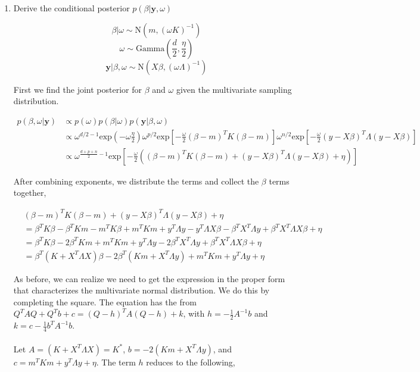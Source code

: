\documentclass[10pt]{article}
\newcommand{\by}{\mathbf{y}}
\begin{document}
    \begin{enumerate}[label=(\Alph*)]

      \item Derive the conditional posterior $p(\beta| \by, \omega)$

        $$\beta | \omega \sim \text{N}(m, (\omega K)^{-1})$$
        $$\omega \sim \text{Gamma}\left(\frac{d}{2}, \frac{\eta}{2} \right)$$
        $$\by | \beta, \omega \sim \text{N}(X\beta, (\omega \Lambda)^{-1})$$

        First we find the joint posterior for $\beta$ and $\omega$ given the multivariate sampling distribution. 

        \begin{align*}
          p(\beta, \omega | \by) &\propto p(\omega) p(\beta| \omega) p(\by | \beta, \omega) \\
          &\propto \omega^{d/2 -1} \text{exp}\left( - \omega \frac{\eta}{2}\right) \omega^{p/2} \text{exp}\left[ -\frac{\omega}{2} (\beta - m)^T K (\beta - m) \right] \omega^{n/2} \text{exp}\left[ -\frac{\omega}{2} (y - X\beta)^T \Lambda (y - X\beta) \right] \\
          &\propto \omega^{\frac{d+p+n}{2}-1} \text{exp}\left[-\frac{\omega}{2} \left ( (\beta - m)^T K (\beta - m) + (y - X\beta)^T \Lambda (y - X\beta) + \eta \right) \right]
        \end{align*}

        After combining exponents, we distribute the terms and collect the $\beta$ terms together,

        \begin{align*}
          & (\beta - m)^T K (\beta - m) + (y - X\beta)^T \Lambda (y - X\beta) + \eta \\
          &= \beta^T K \beta - \beta^T K m - m^T K \beta + m^T K m + y^T \Lambda y - y^T \Lambda X \beta - \beta^T X^T \Lambda y + \beta^T X^T \Lambda X \beta + \eta \\
          &= \beta^T K \beta - 2 \beta^T K m + m^T K m + y^T \Lambda y - 2 \beta^T X^T \Lambda y + \beta^T X^T \Lambda X \beta + \eta \\
          &= \beta^T ( K+ X^T \Lambda X) \beta - 2 \beta^T (K m + X^T \Lambda y) + m^TKm + y^T\Lambda y + \eta
        \end{align*}

        As before, we can realize we need to get the expression in the proper form that characterizes the multivariate normal distribution. We do this by completing the square. The equation has the from $Q^T A Q + Q^T b + c = (Q - h)^T A (Q - h) + k$, with $h = -\frac{1}{2}A^{-1} b$ and $k = c - \frac{1}{4} b^T A^{-1} b$. 
        \\\\
        Let $A = ( K+ X^T \Lambda X) = K^*$, $b = - 2 (K m + X^T \Lambda y)$, and $c = m^T K m + y^T  \Lambda y + \eta$. The term $h$ reduces to the following,


\end{enumerate}
\end{document}
